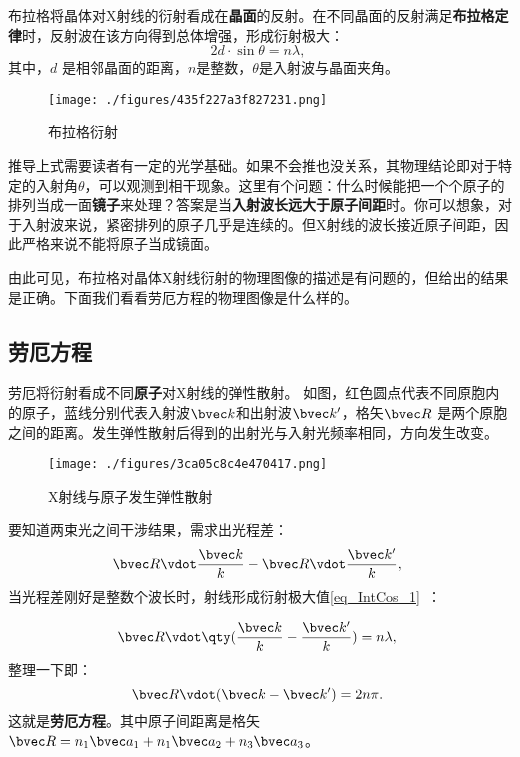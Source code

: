 布拉格将晶体对X射线的衍射看成在\textbf{晶面}的反射。在不同晶面的反射满足\textbf{布拉格定律}时，反射波在该方向得到总体增强，形成衍射极大：
\begin{equation}\label{eq_RecLat_1}
2d \cdot \sin\theta = n\lambda,~
\end{equation}
其中，$d$ 是相邻晶面的距离，$n$是整数，$\theta$是入射波与晶面夹角。
\begin{figure}[ht]
\centering
\texttt{[image: ./figures/435f227a3f827231.png]}
\caption{布拉格衍射} \label{fig_RecLat_2}
\end{figure}
推导上式需要读者有一定的光学基础。如果不会推也没关系，其物理结论即对于特定的入射角$\theta$，可以观测到相干现象。这里有个问题：什么时候能把一个个原子的排列当成一面\textbf{镜子}来处理？答案是当\textbf{入射波长远大于原子间距}时。你可以想象，对于入射波来说，紧密排列的原子几乎是连续的。但X射线的波长接近原子间距，因此严格来说不能将原子当成镜面。

由此可见，布拉格对晶体X射线衍射的物理图像的描述是有问题的，但给出的结果是正确。下面我们看看劳厄方程的物理图像是什么样的。

\subsection{劳厄方程}
劳厄将衍射看成不同\textbf{原子}对X射线的弹性散射。
如图，红色圆点代表不同原胞内的原子，蓝线分别代表入射波$\bvec k$和出射波$\bvec k'$，格矢$\bvec R$ 是两个原胞之间的距离。发生弹性散射后得到的出射光与入射光频率相同，方向发生改变。

\begin{figure}[ht]
\centering
\texttt{[image: ./figures/3ca05c8c4e470417.png]}
\caption{X射线与原子发生弹性散射} \label{fig_RecLat_3}
\end{figure}

要知道两束光之间干涉结果，需求出光程差：
\begin{equation}
\bvec R \vdot \dfrac{\bvec k}{k} - \bvec R \vdot \dfrac{\bvec k'}{k} ,~
\end{equation}
当光程差刚好是整数个波长时，射线形成衍射极大值\autoref{eq_IntCos_1}~：

\begin{align}
\bvec R \vdot \qty( \dfrac{\bvec k}{k} - \dfrac{\bvec k'}{k} ) &= n\lambda ,~\\
\end{align}
整理一下即：
\begin{equation}\label{eq_RecLat_2}
\bvec R \vdot( \bvec k - \bvec k') = 2n\pi.~
\end{equation}
这就是\textbf{劳厄方程}。其中原子间距离是格矢$\bvec R = n_1 \bvec a_1 +  n_1 \bvec a_2 + n_3 \bvec a_3$。 





